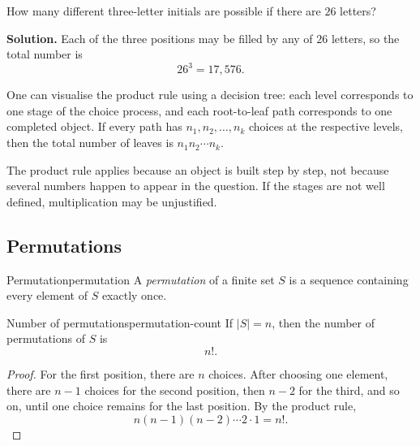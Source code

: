 \begin{examplebox}[title={Tutorial 1, Question 1(a)}]
How many different three-letter initials are possible if there are $26$ letters?

\textbf{Solution.}
Each of the three positions may be filled by any of $26$ letters, so the total number is
\[
26^3=17{,}576.
\]
\end{examplebox}

\begin{extension}[title={Decision-tree viewpoint for the product rule}]
One can visualise the product rule using a decision tree: each level corresponds to one stage of the choice process, and each root-to-leaf path corresponds to one completed object. If every path has $n_1,n_2,\dots,n_k$ choices at the respective levels, then the total number of leaves is $n_1n_2\cdots n_k$.
\end{extension}

\begin{commonmistake}[title={Multiplying visible numbers without identifying stages}]
The product rule applies because an object is built step by step, not because several numbers happen to appear in the question. If the stages are not well defined, multiplication may be unjustified.
\end{commonmistake}

\subsection{Permutations}

\begin{definition}{Permutation}{permutation}
A \emph{permutation} of a finite set $S$ is a sequence containing every element of $S$ exactly once.
\end{definition}

\begin{theorem}{Number of permutations}{permutation-count}
If $|S|=n$, then the number of permutations of $S$ is
\[
n!.
\]
\end{theorem}

\begin{proof}
For the first position, there are $n$ choices. After choosing one element, there are $n-1$ choices for the second position, then $n-2$ for the third, and so on, until one choice remains for the last position. By the product rule,
\[
n(n-1)(n-2)\cdots 2\cdot 1=n!.
\]
\end{proof}

